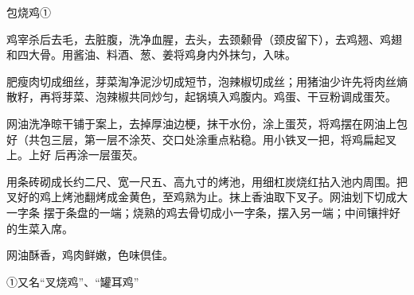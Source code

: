 \begin{recipe}{包烧鸡①}

\ingredients



\cooking

\step 鸡宰杀后去毛，去脏腹，洗净血腥，去头，去颈颡骨（颈皮留下），去鸡翘、鸡翅
和四大骨。用酱油、料酒、葱、姜将鸡身内外抹匀，入味。

\step 肥瘦肉切成细丝，芽菜淘净泥沙切成短节，泡辣椒切成丝；用猪油少许先将肉丝熵
散籽，再将芽菜、泡辣椒共同炒匀，起锅填入鸡腹内。鸡蛋、干豆粉调成蛋芡。

\step 网油洗净晾干铺于案上，去掉厚油边梗，抹干水份，涂上蛋芡，将鸡摆在网油上包
好（共包三层，第一层不涂芡、交口处涂重点粘稳。用小铁叉一把，将鸡扁起叉上。上好
后再涂一层蛋芡。

\step 用条砖砌成长约二尺、宽一尺五、高九寸的烤池，用细杠炭烧红拈入池内周围。把
叉好的鸡上烤池翻烤成金黄色，至鸡熟为止。抹上香油取下叉子。网油划下切成大一字条
摆于条盘的一端；烧熟的鸡去骨切成小一字条，摆入另一端；中间镶拌好的生菜入席。

\features

网油酥香，鸡肉鲜嫩，色味倶佳。

①又名“叉烧鸡”、“罐耳鸡”

\end{recipe}

